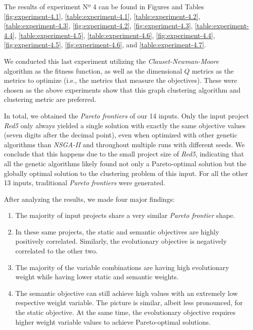 \documentclass[12pt,a4paper]{report}
\begin{document}
The results of experiment Nº 4 can be found in Figures and Tables
\ref{fig:experiment-4.1}, \ref{table:experiment-4.1},  \ref{table:experiment-4.2},
\ref{table:experiment-4.3}, \ref{fig:experiment-4.2}, \ref{fig:experiment-4.3},
\ref{table:experiment-4.4}, \ref{table:experiment-4.5}, \ref{table:experiment-4.6},
\ref{fig:experiment-4.4}, \ref{fig:experiment-4.5}, \ref{fig:experiment-4.6},
and \ref{table:experiment-4.7}.

We conducted this last experiment utilizing the \textit{Clauset-Newman-Moore}
algorithm as the fitness function, as well as the dimensional $Q$ metrics
as the metrics to optimize (i.e., the metrics that measure the objectives).
These were chosen as the above experiments show that this graph clustering
algorithm and clustering metric are preferred.

In total, we obtained the \textit{Pareto frontiers} of our 14 inputs.
Only the input project \textit{Red5} only always yielded a single solution
with exactly the same objective values (seven digits after the decimal point),
even when optimized with other genetic algorithms than \textit{NSGA-II} and
throughout multiple runs with different seeds.
We conclude that this happens due to the small project
size of \textit{Red5}, indicating that all the genetic algorithms
likely found not only a Pareto\hyp optimal solution but the globally optimal
solution to the clustering problem of this input.
For all the other 13 inputs, traditional \textit{Pareto frontiers} were
generated.

After analyzing the results, we made four major findings:
\begin{enumerate}
  \item The majority of input projects share a very similar \textit{Pareto frontier} shape.
  \item In these same projects, the static and semantic objectives are highly positively correlated.
        Similarly, the evolutionary objective is negatively correlated to the other two.
  \item The majority of the variable combinations are having high evolutionary weight while having lower static and semantic weights.
  \item The semantic objective can still achieve high values with an extremely low respective weight variable.
        The picture is similar, albeit less pronounced, for the static objective.
        At the same time, the evolutionary objective requires higher weight variable values to achieve Pareto\hyp optimal solutions.
\end{enumerate}
\end{document}
